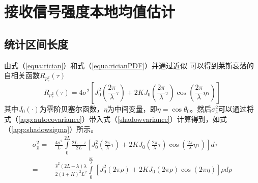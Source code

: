 
\chapter{接收信号强度本地均值估计}
\label{appchap:meanestimation}

\section{统计区间长度}
\label{appsec:lengthestimation}

由式（\ref{equa:rician}）和式（\ref{equa:ricianPDF}）并通过近似 \cite{Austin1994} 可以得到莱斯衰落的自相关函数$R_{p_{r}^2}(\tau)$
\begin{equation}
    R_{p_{r}^2}(\tau)=4\sigma^2\left[J_0^2\left(\frac{2\pi}{\lambda}\tau\right)+2KJ_0\left(\frac{2\pi}{\lambda}\tau\right)\cos\left(\frac{2\pi}{\lambda}\eta\tau\right)\right]
\label{app:autocovariance}
\end{equation}
其中$J_0(\cdot)$为零阶贝塞尔函数，$\eta$为中间变量，即$\eta=\cos\theta_0$。然后$\sigma_{\hat{s}}^2$可以通过将式（\ref{app:autocovariance}）带入式（\ref{shadowvariance}）计算得到，如式（\ref{app:shadowsigma}）所示。
\begin{equation}
\begin{split}
\sigma_{\hat{s}}^{2}=&\frac{4\sigma^2}{L}\int\limits_{0}^{2L}\frac{2L-\tau}{2L}[J_0^2(\frac{2\pi}{\lambda}\tau)+2KJ_0(\frac{2\pi}{\lambda}\tau)\cos(\frac{2\pi}{\lambda}\eta\tau)]d\tau\\
=&\frac{\hat{s}^2(2L-\lambda)\lambda}{2(1+K)^{2}L^2}\int\limits_0^{\frac{2L}{\lambda}}[J_0^2(2\pi \rho)+2KJ_0(2\pi \rho)\cos(2\pi \eta)]\rho d\rho
\end{split}
\label{app:shadowsigma}
\end{equation}
